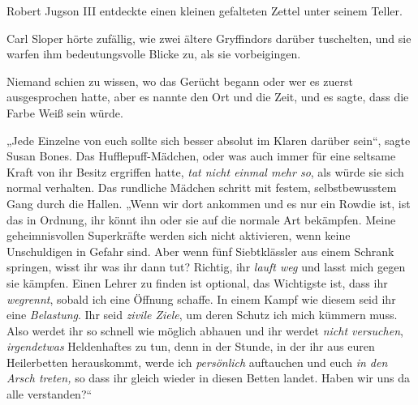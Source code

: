 Robert Jugson III entdeckte einen kleinen gefalteten Zettel unter seinem Teller.

Carl Sloper hörte zufällig, wie zwei ältere Gryffindors darüber tuschelten, und sie warfen ihm bedeutungsvolle Blicke zu, als sie vorbeigingen.

Niemand schien zu wissen, wo das Gerücht begann oder wer es zuerst ausgesprochen hatte, aber es nannte den Ort und die Zeit, und es sagte, dass die Farbe Weiß sein würde.

\later

„Jede Einzelne von euch sollte sich besser absolut im Klaren darüber sein“, sagte Susan Bones. Das Hufflepuff-Mädchen, oder was auch immer für eine seltsame Kraft von ihr Besitz ergriffen hatte, \emph{tat nicht einmal mehr so}, als würde sie sich normal verhalten. Das rundliche Mädchen schritt mit festem, selbstbewusstem Gang durch die Hallen.
„Wenn wir dort ankommen und es nur ein Rowdie ist, ist das in Ordnung, ihr könnt ihn oder sie auf die normale Art bekämpfen. Meine geheimnisvollen Superkräfte werden sich nicht aktivieren, wenn keine Unschuldigen in Gefahr sind. Aber wenn fünf Siebtklässler aus einem Schrank springen, wisst ihr was ihr dann tut? Richtig, ihr \emph{lauft weg} und lasst mich gegen sie kämpfen. Einen Lehrer zu finden ist optional, das Wichtigste ist, dass ihr \emph{wegrennt}, sobald ich eine Öffnung schaffe. In einem Kampf wie diesem seid ihr eine \emph{Belastung}. Ihr seid \emph{zivile Ziele}, um deren Schutz ich mich kümmern muss. Also werdet ihr so schnell wie möglich abhauen und ihr werdet \emph{nicht versuchen}, \emph{irgendetwas} Heldenhaftes zu tun, denn in der Stunde, in der ihr aus euren Heilerbetten herauskommt, werde ich \emph{persönlich} auftauchen und euch \emph{in den Arsch treten,} so dass ihr gleich wieder in diesen Betten landet. Haben wir uns da alle verstanden?“

